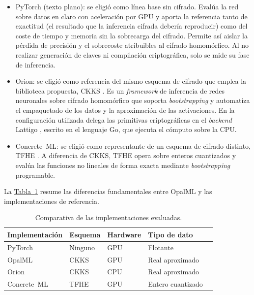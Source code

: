 \begin{itemize}
    \item PyTorch (texto plano): se eligió como línea base sin cifrado. Evalúa la red sobre datos en claro con aceleración por GPU y aporta la referencia tanto de exactitud (el resultado que la inferencia cifrada debería reproducir) como del coste de tiempo y memoria sin la sobrecarga del cifrado. Permite así aislar la pérdida de precisión y el sobrecoste atribuibles al cifrado homomórfico. Al no realizar generación de claves ni compilación criptográfica, solo se mide su fase de inferencia.

    \item Orion: se eligió como referencia del mismo esquema de cifrado que emplea la biblioteca propuesta, CKKS \cite{Orion}. Es un \textit{framework} de inferencia de redes neuronales sobre cifrado homomórfico que soporta \textit{bootstrapping} y automatiza el empaquetado de los datos y la aproximación de las activaciones. En la configuración utilizada delega las primitivas criptográficas en el \textit{backend} Lattigo \cite{Lattigo}, escrito en el lenguaje Go, que ejecuta el cómputo sobre la CPU.

    \item Concrete~ML: se eligió como representante de un esquema de cifrado distinto, TFHE \cite{ConcreteML}. A diferencia de CKKS, TFHE opera sobre enteros cuantizados y evalúa las funciones no lineales de forma exacta mediante \textit{bootstrapping} programable. 
\end{itemize}

La \hyperref[tab:metodo_libs]{Tabla~\ref{tab:metodo_libs}} resume las diferencias fundamentales entre OpalML y las implementaciones de referencia.

\begin{table}[h]
    \centering
    \caption{Comparativa de las implementaciones evaluadas.}\label{tab:metodo_libs}
    \vspace{0.5em}
    \begin{tabular}{| l | l | l | l | l |}
        \hline
        Implementación & Esquema & Hardware & Tipo de dato \\
        \hline
        PyTorch & Ninguno & GPU & Flotante \\
        \hline
        OpalML & CKKS & GPU & Real aproximado \\
        \hline
        Orion & CKKS & CPU & Real aproximado \\
        \hline
        Concrete~ML & TFHE & GPU & Entero cuantizado \\
        \hline
    \end{tabular}
\end{table}

